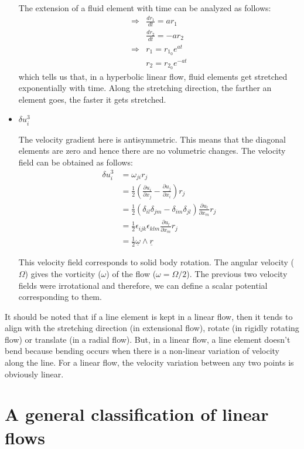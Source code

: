 \documentclass[11pt,a4paper]{article}
\newcommand{\dl}{\delta}
\newcommand{\pd}[2]{\frac{\partial #1}{\partial #2}}
\newcommand{\vv}[1]{\underline{#1}}
\newcommand{\1}{\vect{1}}
\newcommand{\RA}{\Rightarrow}
\newcommand{\half}{\frac{1}{2}}
\begin{document}
\begin{itemize}
The extension of a fluid element with time can be analyzed as follows:
\begin{align*}
\RA& \frac{dr_1}{dt} = a r_1 \\
&\frac{dr_2}{dt} = -a r_2\\
\RA& r_1 = r_{1_0}e^{at}\\
& r_2 = r_{2_0}e^{-at}
\end{align*}
which tells us that, in a hyperbolic linear flow, fluid elements get stretched exponentially with time. Along the stretching direction, the farther an element goes, the faster it gets stretched. 

\item $\dl u^3_i$

The velocity gradient here is antisymmetric. This means that the diagonal elements are zero and hence there are no volumetric changes. The velocity field can be obtained as follows:
\begin{align*}
\dl u^3_i &= \omega_{ji} r_j\\
&= \half (\pd{u_i}{x_j} - \pd{u_j}{x_i})r_j\\ 
&= \half (\dl_{il}\dl_{jm}-\dl_{im}\dl_{jl})\pd{u_l}{x_m} r_j\\
&= \half \epsilon_{ijk}\epsilon_{klm}\pd{u_l}{x_m} r_j\\
&= \half \vv \omega \wedge \vv r
\end{align*}

 This velocity field corresponds to solid body rotation. The angular velocity ($\Omega$) gives the vorticity ($\omega$) of the flow ($\omega = \Omega/2$). The previous two velocity fields were irrotational and therefore, we can define a scalar potential corresponding to them.

\end{itemize}

It should be noted that if a line element is kept in a linear flow, then it tends to align with the stretching direction (in extensional flow), rotate (in rigidly rotating flow) or translate (in a radial flow). But, in a linear flow, a line element doesn't bend because bending occurs when there is a non-linear variation of velocity along the line. For a linear flow, the velocity variation between any two points is obviously linear.

\section{A general classification of linear flows}
\end{document}
